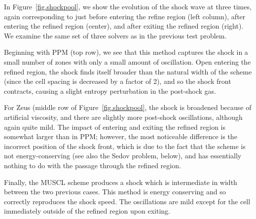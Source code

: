 In Figure~\ref{fig.shockpool}, we show the evolution of the shock wave at three times, again corresponding to just before entering the refine region (left column), after entering the refined region (center), and after exiting the refined region (right).  We examine the same set of three solvers as in the previous test problem.

Beginning with PPM (top row), we see that this method captures the shock in a small number of zones with only a small amount of oscillation.  Open entering the refined region, the shock finds itself broader than the natural width of the scheme (since the cell spacing is decreased by a factor of 2), and so the shock front contracts, causing a slight entropy perturbation in the post-shock gas. 

For Zeus (middle row of Figure~\ref{fig.shockpool}, the shock is broadened because of artificial viscosity, and there are slightly more post-shock oscillations, although again quite mild.  The impact of entering and exiting the refined region is somewhat larger than in PPM; however, the most noticeable difference is the incorrect position of the shock front, which is due to the fact that the scheme is not energy-conserving (see also the Sedov problem, below), and has essentially nothing to do with the passage through the refined region.

Finally, the MUSCL scheme produces a shock which is intermediate in width between the two previous cases.  This method is energy conserving and so correctly reproduces the shock speed.  The oscillations are mild except for the cell immediately outside of the refined region upon exiting.

